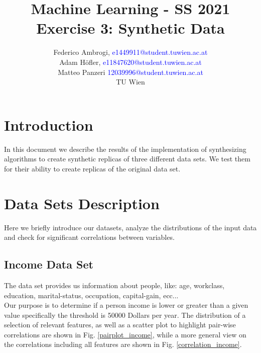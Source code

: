\documentclass{article}
\begin{document}
\title{ Machine Learning - SS 2021 \\ Exercise 3: Synthetic Data }


	\author{Federico Ambrogi, \textcolor{blue} {e1449911@student.tuwien.ac.at } \\
	Adam Höfler, \textcolor{blue} {e11847620@student.tuwien.ac.at } \\
	Matteo Panzeri \textcolor{blue}{12039996@student.tuwien.ac.at } \\
    TU Wien }






\maketitle
\setcounter{tocdepth}{2}
\tableofcontents

\section*{Introduction}
In this document we describe the results of the implementation of synthesizing algorithms to create synthetic replicas of three different data sets. We test them for their ability to create replicas of the original data set.



\section{Data Sets Description}
Here we briefly introduce our datasets, analyze the distributions of the input data and check for significant correlations between variables.

\clearpage
\subsection{Income Data Set}
The data set \cite{income} provides us information about people, like: age, workclass, education, marital-status, occupation, capital-gain, ecc...\\
Our purpose is to determine if a person income is lower or greater than a given value specifically the threshold is 50000 Dollars per year. The distribution of a selection of relevant features, as well as a scatter plot to highlight pair-wise correlations are shown in Fig. \ref{pairplot_income}, while a more general view on the correlations including all features are shown in Fig. \ref{correlation_income}.\\
\end{document}

